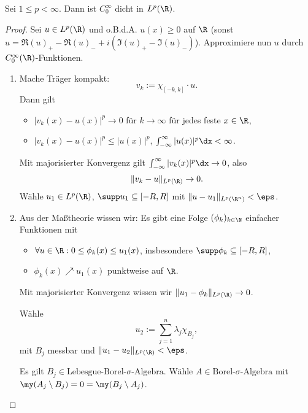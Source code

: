 \begin{st} \label{4.18}
	Sei $1 \le p < \infty$.
	Dann ist $C_0^\infty$ dicht in $L^p(\R)$.
	\begin{proof}
		Sei $u \in L^p(\R)$ und o.B.d.A. $u(x) \ge 0$ auf $\R$ (sonst $u = \Re(u)_+ - \Re(u)_- + i(\Im(u)_+ - \Im(u)_-)$).
		Approximiere nun $u$ durch $C_0^\infty(\R)$-Funktionen.
		\begin{enumerate}[1)]
			\item
				Mache Träger kompakt:
				\[
					v_k := \chi_{[-k,k]}\cdot u.
				\]
				Dann gilt
				\begin{itemize}
					\item
						$|v_k(x)-u(x)|^p \to 0$ für $k\to \infty$ für jedes feste $x \in \R$,
					\item
						$|v_k(x)-u(x)|^p \le |u(x)|^p$, $\int_{-\infty}^\infty |u(x)|^p \dx < \infty$.
				\end{itemize}
				Mit majorisierter Konvergenz gilt $\int_{-\infty}^\infty |v_k(x)|^p \dx \to 0$, also
				\[
					\|v_k - u\|_{L^p(\R)} \to 0.
				\]
				Wähle $u_1 \in L^p(\R)$, $\supp u_1 \subset [-R,R]$ mit $\|u-u_1\|_{L^p(\R^n)} < \eps$.
			\item
				Aus der Maßtheorie wissen wir: Es gibt eine Folge $(\phi_k)_{k\in \N}$ einfacher Funktionen mit
				\begin{itemize}
					\item
						$\forall u \in \R : 0 \le \phi_k(x) \le u_1(x)$, insbesondere $\supp \phi_k \subset [-R,R]$,
					\item
						$\phi_k(x) \nearrow u_1(x)$ punktweise auf $\R$.
				\end{itemize}
				Mit majorisierter Konvergenz wissen wir $\|u_1 - \phi_k\|_{L^p(\R)} \to 0$.

				Wähle 
				\[
					u_2 := \sum_{j=1}^n \lambda_j \chi_{B_j},
				\]
				mit $B_j$ messbar und $\|u_1-u_2\|_{L^p(\R)} < \eps$.

				Es gilt $B_j \in \text{Lebesgue-Borel-$\sigma$-Algebra}$.
				Wähle $A \in \text{Borel-$\sigma$-Algebra}$ mit $\my(A_j \setminus B_j) = 0 = \my(B_j \setminus A_j)$.


\end{enumerate}
\end{proof}
\end{st}

